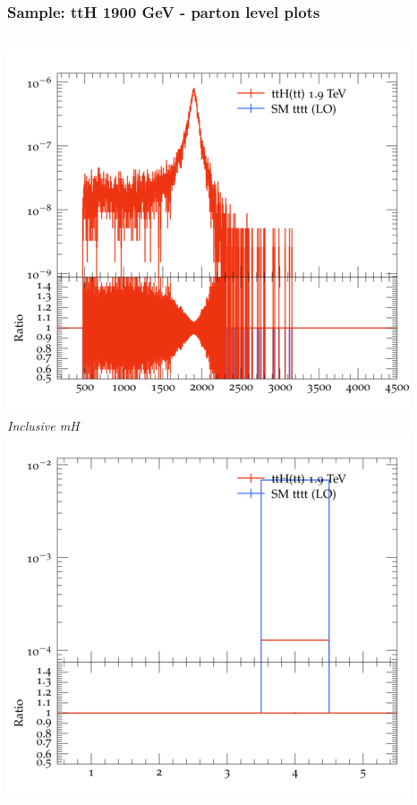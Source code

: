 \documentclass{beamer}
\begin{document}
\begin{frame}
\frametitle{Sample: ttH 1900 GeV - parton level plots}
\begin{columns}
\includegraphics[width=\textwidth]{../plots/ttH_1900/tttt_ttH/Inclusive_mH.png}\\
\textit{\small Inclusive mH}
\includegraphics[width=\textwidth]{../plots/ttH_1900/tttt_ttH/Inclusive_nTop.png}\\

\end{columns}
\end{frame}
\end{document}
